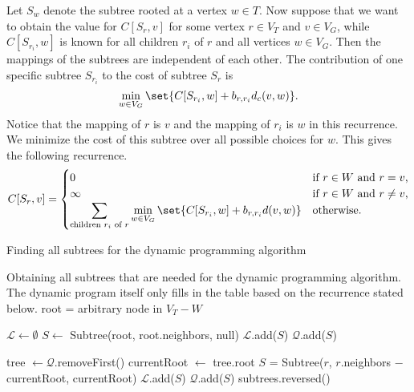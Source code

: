 Let $S_w$ denote the subtree rooted at a vertex $w \in T$.
Now suppose that we want to obtain the value for $C[S_r, v]$ for some vertex $r \in V_T$ and $v \in V_G$, while $C[S_{r_i}, w]$ is known for all children $r_i$ of $r$ and all vertices $w \in V_G$.
Then the mappings of the subtrees are independent of each other.
The contribution of one specific subtree $S_{r_i}$ to the cost of subtree $S_r$ is
\[
    \min_{w \in V_G} \set{C[S_{r_i}, w] + b_{r, r_i} d_c(v, w)}.
\]
Notice that the mapping of $r$ is $v$ and the mapping of $r_i$ is $w$ in this recurrence.
We minimize the cost of this subtree over all possible choices for $w$.
This gives the following recurrence.
\[
    C[S_r, v] = \begin{cases}
                  0 &\text{if $r \in W$ and $r = v$,} \\
                  \infty &\text{if $r \in W$ and $r \neq v$,} \\
                  \displaystyle \sum_{\text{children $r_i$ of $r$}} \min_{w \in V_G} \set{ C[S_{r_i}, w] + b_{r, r_i} d(v, w) } &\text{otherwise.} \\
    \end{cases}
\]

\begin{algorithm}[t]
    \caption{Finding all subtrees for the dynamic programming algorithm}
    \label{alg:subtrees}
    \begin{algorithmic}[1]
        \Statex Obtaining all subtrees that are needed for the dynamic programming algorithm.
        The dynamic program itself only fills in the table based on the recurrence stated below.
            \State root = arbitrary node in $V_T - W$

            \State $\mathcal L \gets \emptyset$
            \State $S \gets$ Subtree(root, root.neighbors, null) 
            \State $\mathcal L$.add($S$)
            \State $\mathcal Q$.add($S$)

                \State tree $\gets \mathcal Q$.removeFirst()
                \State currentRoot $\gets$ tree.root
                    \State $S$ = Subtree($r$, $r$.neighbors $-$ currentRoot, currentRoot)
                    \State $\mathcal L$.add($S$)
                    \State $\mathcal Q$.add($S$)
                \EndFor
            \EndWhile
            \State \Return subtrees.reversed()
        \EndProcedure
    \end{algorithmic}
\end{algorithm}


